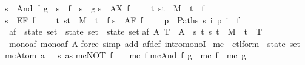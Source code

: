 \begin{isabellebody}
{\isachardoublequote}s\ {\isasymTurnstile}\ And\ f\ g\ {\isacharequal}\ {\isacharparenleft}s\ {\isasymTurnstile}\ f\ {\isasymand}\ s\ {\isasymTurnstile}\ g{\isacharparenright}{\isachardoublequote}\isanewline
{\isachardoublequote}s\ {\isasymTurnstile}\ AX\ f\ \ \ \ {\isacharequal}\ {\isacharparenleft}{\isasymforall}t{\isachardot}\ {\isacharparenleft}s{\isacharcomma}t{\isacharparenright}\ {\isasymin}\ M\ {\isasymlongrightarrow}\ t\ {\isasymTurnstile}\ f{\isacharparenright}{\isachardoublequote}\isanewline
{\isachardoublequote}s\ {\isasymTurnstile}\ EF\ f\ \ \ \ {\isacharequal}\ {\isacharparenleft}{\isasymexists}t{\isachardot}\ {\isacharparenleft}s{\isacharcomma}t{\isacharparenright}\ {\isasymin}\ M{\isacharcircum}{\isacharasterisk}\ {\isasymand}\ t\ {\isasymTurnstile}\ f{\isacharparenright}{\isachardoublequote}\isanewline
{\isachardoublequote}s\ {\isasymTurnstile}\ AF\ f\ \ \ \ {\isacharequal}\ {\isacharparenleft}{\isasymforall}p\ {\isasymin}\ Paths\ s{\isachardot}\ {\isasymexists}i{\isachardot}\ p\ i\ {\isasymTurnstile}\ f{\isacharparenright}{\isachardoublequote}\isanewline
\isanewline
{}\ af\ {\isacharcolon}{\isacharcolon}\ {\isachardoublequote}state\ set\ {\isasymRightarrow}\ state\ set\ {\isasymRightarrow}\ state\ set{\isachardoublequote}\isanewline
{\isachardoublequote}af\ A\ T\ {\isasymequiv}\ A\ {\isasymunion}\ {\isacharbraceleft}s{\isachardot}\ {\isasymforall}t{\isachardot}\ {\isacharparenleft}s{\isacharcomma}\ t{\isacharparenright}\ {\isasymin}\ M\ {\isasymlongrightarrow}\ t\ {\isasymin}\ T{\isacharbraceright}{\isachardoublequote}\isanewline
\isanewline
{}\ mono{\isacharunderscore}af{\isacharcolon}\ {\isachardoublequote}mono{\isacharparenleft}af\ A{\isacharparenright}{\isachardoublequote}\isanewline
{}force\ simp\ add{\isacharcolon}\ af{\isacharunderscore}def\ intro{\isacharcolon}monoI{\isacharparenright}\isanewline
\isanewline
{}\ mc\ {\isacharcolon}{\isacharcolon}\ {\isachardoublequote}ctl{\isacharunderscore}form\ {\isasymRightarrow}\ state\ set{\isachardoublequote}\isanewline
{}\isanewline
{\isachardoublequote}mc{\isacharparenleft}Atom\ a{\isacharparenright}\ \ {\isacharequal}\ {\isacharbraceleft}s{\isachardot}\ a{\isasymin}s{\isacharbraceright}{\isachardoublequote}\isanewline
{\isachardoublequote}mc{\isacharparenleft}NOT\ f{\isacharparenright}\ \ \ {\isacharequal}\ {\isacharminus}mc\ f{\isachardoublequote}\isanewline
{\isachardoublequote}mc{\isacharparenleft}And\ f\ g{\isacharparenright}\ {\isacharequal}\ mc\ f\ {\isasyminter}\ mc\ g{\isachardoublequote}\isanewline

\end{isabellebody}
